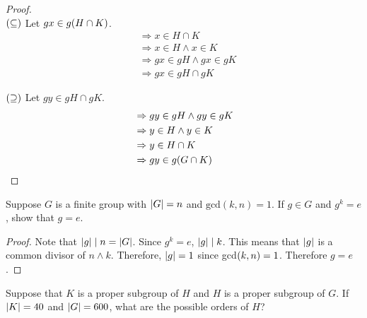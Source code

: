 \begin{proof} \phantom{blank} \\
    $\qty(\subseteq)$ Let $gx \in g\qty(H \cap K)$. 
    \begin{align*}
        &\Rightarrow x \in H \cap K \\
        &\Rightarrow x \in H \land x \in K \\
        &\Rightarrow gx \in gH \land gx \in gK \\
        &\Rightarrow gx \in gH \cap gK
    \end{align*}
    
    $\qty(\supseteq)$ Let $gy \in gH \cap gK$.  
    \begin{align*}
        &\Rightarrow gy \in gH \land gy \in gK \\
        &\Rightarrow y \in H \land y \in K \\
        &\Rightarrow y \in H \cap K \\
        &\Rightarrow gy \in g\qty(G \cap K)
    \end{align*}
\end{proof}

\begin{exercise}
    Suppose $G$ is a finite group with $\qty|G| = n$ and $\text{gcd}(k,n) = 1$. If $g \in G$ and $g^k = e$, show that $g = e$.
\end{exercise}

\begin{proof}
    Note that $\qty|g|\mid n = \qty|G|$. Since $g^k = e$, $\qty|g| \mid k$. This means that $\qty|g|$ is a common divisor of $n \land k$. Therefore, $\qty|g| = 1$ since gcd$\qty(k, n)  = 1$. Therefore $g = e$. \qedsymbol
\end{proof}

\begin{exercise}
    Suppose that $K$ is a proper subgroup of $H$ and $H$ is a proper subgroup of $G$. If $\qty|K| = 40$ and $\qty|G| = 600$, what are the possible orders of $H$?
\end{exercise}

